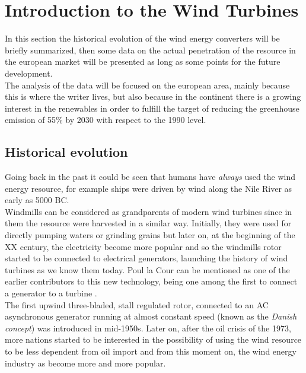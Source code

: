 \newpage
\section{Introduction to the Wind Turbines}\label{sec:c_WT_characteristics}
In this section the historical evolution of the wind energy converters will be briefly summarized, then some data on the actual penetration of the resource in the european market will be presented as long as some points for the future development. \\
The analysis of the data will be focused on the european area, mainly because this is where the writer lives, but also because in the continent there is a growing interest in the renewables in order to fulfill the target of reducing the greenhouse emission of 55\% by 2030 with respect to the 1990 level. 

\subsection{Historical evolution}
Going back in the past it could be seen that humans have \textit{always} used the wind energy resource, for example ships were driven by wind along the Nile River as early as 5000 BC.\\
Windmills can be considered as grandparents of modern wind turbines since in them the resource were harvested in a similar way. Initially, they were used for directly pumping waters or grinding grains but later on, at the beginning of the XX century, the electricity become more popular and so the windmills rotor started to be connected to electrical generators, launching the history of wind turbines as we know them today. Poul la Cour can be mentioned as one of the earlier contributors to this new technology, being one among the first to connect a generator to a turbine \cite{Aerodynamics_of_wind_turbines}. \\
The first upwind three-bladed, stall regulated rotor, connected to an AC asynchronous generator running at almost constant speed (known as the \textit{Danish concept}) was introduced in mid-1950s. Later on, after the oil crisis of the 1973, more nations started to be interested in the possibility of using the wind resource to be less dependent from oil import and from this moment on, the wind energy industry as become more and more popular. 

